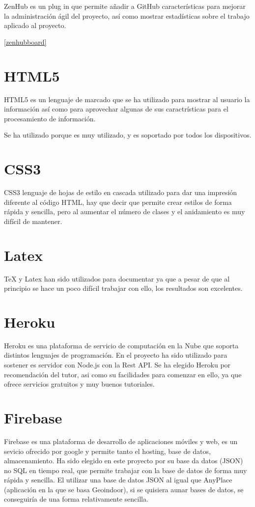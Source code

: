 ZenHub es un plug in que permite añadir a GitHub características para mejorar la administración ágil del proyecto, así como mostrar estadísticas sobre el trabajo aplicado al proyecto.


\ref{zenhubboard}

\section{HTML5}\label{HTML5}

HTML5 es un lenguaje de marcado que se ha utilizado para mostrar al usuario la información así como para aprovechar algunas de sus caractrísticas para el procesamiento de información.

Se ha utilizado porque es muy utilizado, y es soportado por todos los dispositivos.

\section{CSS3}\label{CSS3}

CSS3 lenguaje de hojas de estilo en cascada utilizado para dar una impresión diferente al código HTML, hay que decir que permite crear estilos de forma rápida y sencilla, pero al aumentar el número de clases y el anidamiento es muy difícil de mantener. 
 

\section{Latex}\label{Latex}

\TeX{} y Latex han sido utilizados para documentar ya que a pesar de que al principio se hace un poco difícil trabajar con ello, los resultados son excelentes.

\section{Heroku}\label{Heroku}

Heroku es una plataforma de servicio de computación en la Nube que soporta distintos lenguajes de programación.
En el proyecto ha sido utilizado para sostener es servidor con Node.js con la Rest API. Se ha elegido Heroku por recomendación del tutor, asi como su facilidades para comenzar en ello, ya que ofrece servicios gratuitos y muy buenos tutoriales.

\section{Firebase}\label{Firebase}

Firebase es una plataforma de desarrollo de aplicaciones móviles y web, es un sevicio ofrecido por google y permite tanto el hosting, base de datos, almacenamiento. Ha sido elegido en este proyecto por su base da datos (JSON) no SQL en tiempo real, que permite trabajar con la base de datos de forma muy rápida y sencilla. El utilizar una base de datos JSON al igual que AnyPlace (aplicación en la que se basa Geoindoor), si se quisiera aunar bases de datos, se conseguiría de una forma relativamente sencilla.


